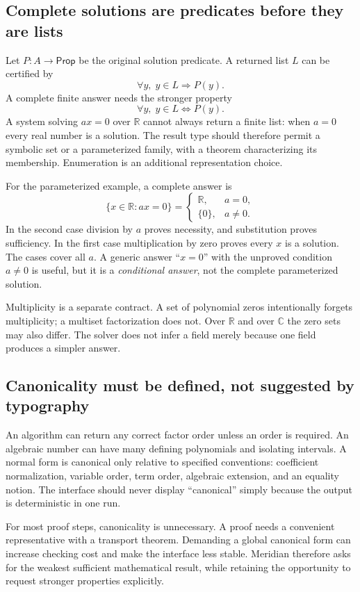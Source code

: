\documentclass[11pt,a4paper]{article}
\newcommand{\R}{\mathbb R}
\newcommand{\C}{\mathbb C}
\theoremstyle{remark}
\begin{document}
\subsection{Complete solutions are predicates before they are lists}
Let $P:A\to\mathsf{Prop}$ be the original solution predicate. A returned list $L$
can be certified by
\[
 \forall y,\;y\in L\Longrightarrow P(y).
\]
A complete finite answer needs the stronger property
\[
 \forall y,\;y\in L\Longleftrightarrow P(y).
\]
A system solving $a x=0$ over $\R$ cannot always return a finite list: when $a=0$
every real number is a solution. The result type should therefore permit a
symbolic set or a parameterized family, with a theorem characterizing its
membership. Enumeration is an additional representation choice.

For the parameterized example, a complete answer is
\[
 \{x\in\R:ax=0\}=
 \begin{cases}
   \R,&a=0,\\
   \{0\},&a\ne0.
 \end{cases}
\]
In the second case division by $a$ proves necessity, and substitution proves
sufficiency. In the first case multiplication by zero proves every $x$ is a
solution. The cases cover all $a$. A generic answer ``$x=0$'' with the unproved
condition $a\ne0$ is useful, but it is a \emph{conditional answer}, not the
complete parameterized solution.

Multiplicity is a separate contract. A set of polynomial zeros intentionally
forgets multiplicity; a multiset factorization does not. Over $\R$ and over $\C$
the zero sets may also differ. The solver does not infer a field merely because
one field produces a simpler answer.

\subsection{Canonicality must be defined, not suggested by typography}
An algorithm can return any correct factor order unless an order is required.
An algebraic number can have many defining polynomials and isolating intervals.
A normal form is canonical only relative to specified conventions: coefficient
normalization, variable order, term order, algebraic extension, and an equality
notion. The interface should never display ``canonical'' simply because the
output is deterministic in one run.

For most proof steps, canonicality is unnecessary. A proof needs a convenient
representative with a transport theorem. Demanding a global canonical form can
increase checking cost and make the interface less stable. Meridian therefore
asks for the weakest sufficient mathematical result, while retaining the
opportunity to request stronger properties explicitly.
\end{document}
